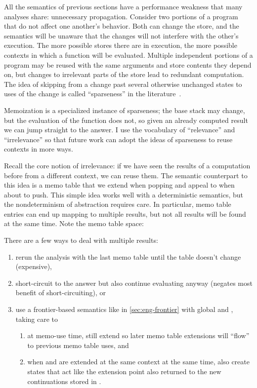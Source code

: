 All the semantics of previous sections have a performance weakness that many analyses share: unnecessary propagation.
Consider two portions of a program that do not affect one another's behavior.
Both can change the store, and the semantics will be unaware that the changes will not interfere with the other's execution.
The more possible stores there are in execution, the more possible contexts in which a function will be evaluated.
Multiple independent portions of a program may be reused with the same arguments and store contents they depend on, but changes to irrelevant parts of the store lead to redundant computation.
The idea of skipping from a change past several otherwise unchanged states to uses of the change is called ``sparseness'' in the literature~\citep{dvanhorn:Reif1977Symbolic,dvanhorn:Wegman1991Constant,dvanhorn:Oh2012Design}.


Memoization is a specialized instance of sparseness; the base stack may change, but the evaluation of the function does not, so given an already computed result we can jump straight to the answer.
I use the vocabulary of ``relevance'' and ``irrelevance'' so that future work can adopt the ideas of sparseness to reuse contexts in more ways.


Recall the core notion of irrelevance: if we have seen the results of a computation before from a different context, we can reuse them.
The semantic counterpart to this idea is a memo table that we extend when popping and appeal to when about to push.
This simple idea works well with a deterministic semantics, but the nondeterminism of abstraction requires care.
In particular, memo table entries can end up mapping to multiple results, but not all results will be found at the same time.
Note the memo table space:

There are a few ways to deal with multiple results:
\begin{enumerate}
\item{rerun the analysis with the last memo table until the table doesn't change (expensive),}
\item{short-circuit to the answer but also continue evaluating anyway (negates most benefit of short-circuiting), or}
\item{use a frontier-based semantics like in \autoref{sec:eng-frontier} with global  and , taking care to
    \begin{enumerate}
    \item{at memo-use time, still extend  so later memo table extensions will ``flow'' to previous memo table uses, and}
    \item{when  and  are extended at the same context at the same time, also create states that act like the  extension point also returned to the new continuations stored in .}
    \end{enumerate}}
\end{enumerate}

